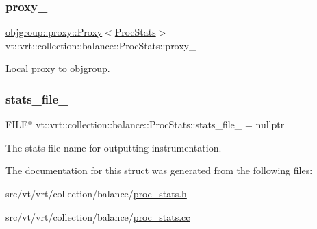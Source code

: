 \subsubsection{\texorpdfstring{proxy\+\_\+}{proxy\_}}
{\footnotesize\ttfamily \hyperlink{structvt_1_1objgroup_1_1proxy_1_1_proxy}{objgroup\+::proxy\+::\+Proxy}$<$\hyperlink{structvt_1_1vrt_1_1collection_1_1balance_1_1_proc_stats}{Proc\+Stats}$>$ vt\+::vrt\+::collection\+::balance\+::\+Proc\+Stats\+::proxy\+\_\+\hspace{0.3cm}{\ttfamily [private]}}



Local proxy to objgroup. 

\mbox{\label{structvt_1_1vrt_1_1collection_1_1balance_1_1_proc_stats_a7c1a0cd0d083053cc4670873bc4f6ef1}} 
\subsubsection{\texorpdfstring{stats\+\_\+file\+\_\+}{stats\_file\_}}
{\footnotesize\ttfamily F\+I\+LE$\ast$ vt\+::vrt\+::collection\+::balance\+::\+Proc\+Stats\+::stats\+\_\+file\+\_\+ = nullptr\hspace{0.3cm}{\ttfamily [private]}}



The stats file name for outputting instrumentation. 



The documentation for this struct was generated from the following files\+:\begin{DoxyCompactItemize}
\item 
src/vt/vrt/collection/balance/\hyperlink{proc__stats_8h}{proc\+\_\+stats.\+h}\item 
src/vt/vrt/collection/balance/\hyperlink{proc__stats_8cc}{proc\+\_\+stats.\+cc}\end{DoxyCompactItemize}
